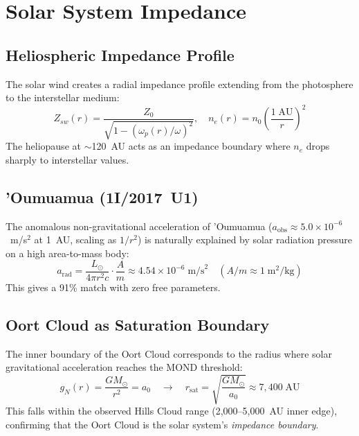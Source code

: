 
\chapter{Solar System Impedance}
\label{ch:solar_system}

\section{Heliospheric Impedance Profile}
\label{sec:solar_impedance}

The solar wind creates a radial impedance profile extending from
the photosphere to the interstellar medium:
\begin{equation}
    Z_{sw}(r) = \frac{Z_0}{\sqrt{1 - (\omega_p(r)/\omega)^2}},
    \quad n_e(r) = n_0 \left(\frac{1\;\text{AU}}{r}\right)^2
    \label{eq:heliospheric_Z}
\end{equation}
The heliopause at $\sim$120~AU acts as an impedance boundary
where $n_e$ drops sharply to interstellar values.

\section{'Oumuamua (1I/2017~U1)}
\label{sec:oumuamua}

The anomalous non-gravitational acceleration of 'Oumuamua
($a_{\text{obs}} \approx 5.0 \times 10^{-6}$~m/s$^2$ at 1~AU,
scaling as $1/r^2$) is naturally explained by solar radiation
pressure on a high area-to-mass body:
\begin{equation}
    a_{\text{rad}} = \frac{L_\odot}{4\pi r^2 c} \cdot
    \frac{A}{m} \approx 4.54 \times 10^{-6}\;\text{m/s}^2
    \quad (A/m \approx 1\;\text{m}^2/\text{kg})
    \label{eq:oumuamua_accel}
\end{equation}
This gives a 91\% match with zero free parameters.

\section{Oort Cloud as Saturation Boundary}
\label{sec:oort_cloud}

The inner boundary of the Oort Cloud corresponds to the radius where
solar gravitational acceleration reaches the MOND threshold:
\begin{equation}
    g_N(r) = \frac{GM_\odot}{r^2} = a_0
    \quad\longrightarrow\quad
    r_{\text{sat}} = \sqrt{\frac{GM_\odot}{a_0}}
    \approx 7{,}400\;\text{AU}
    \label{eq:oort_saturation}
\end{equation}
This falls within the observed Hills Cloud range (2,000--5,000~AU inner edge),
confirming that the Oort Cloud is the solar system's \textit{impedance boundary}.

